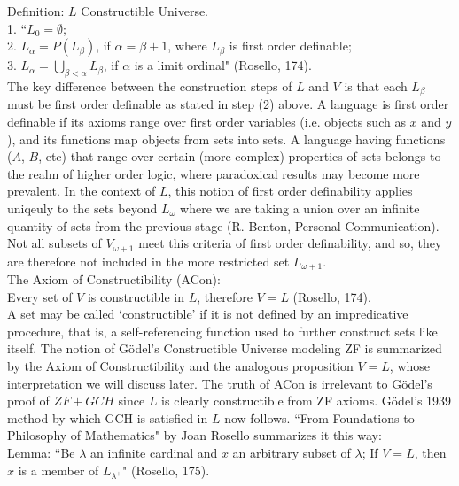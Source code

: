 \documentclass[10pt,letterpaper]{amsart}
\numberwithin{equation}{section}
\theoremstyle{plain}
\theoremstyle{definition}
\numberwithin{equation}{section}
\begin{document}
\noindent Definition: $L$ Constructible Universe.\\
1. ``$L_0=\emptyset$; \\
2. $L_{\alpha}=P(L_\beta)$, if $\alpha=\beta+1$, where $L_\beta$ is first order definable; \\
3. $L_\alpha=\bigcup_{\beta < \alpha} L_\beta$, if $\alpha$ is a limit ordinal" (Rosello, 174). \\

The key difference between the construction steps of $L$ and $V$ is that each $L_\beta$ must be first order definable as stated in step (2) above. A language is first order definable if its axioms range over first order variables (i.e. objects such as $x$ and $y$), and its functions map objects from sets into sets. A language having functions ($A$, $B$, etc) that range over certain (more complex) properties of sets belongs to the realm of higher order logic, where paradoxical results may become more prevalent. In the context of $L$, this notion of first order definability applies uniqeuly to the sets beyond $L_\omega$ where we are taking a union over an infinite quantity of sets from the previous stage (R. Benton, Personal Communication). Not all subsets of $V_{\omega+1}$ meet this criteria of first order definability, and so, they are therefore not included in the more restricted set $L_{\omega+1}$. \\

\noindent The Axiom of Constructibility (ACon):\\
Every set of $V$ is constructible in $L$, therefore $V=L$ (Rosello, 174).\\

A set may be called `constructible' if it is not defined by an impredicative procedure, that is, a self-referencing function used to further construct sets like itself. The notion of Gödel's Constructible Universe modeling ZF is summarized by the Axiom of Constructibility and the analogous proposition $V=L$, whose interpretation we will discuss later. The truth of ACon is irrelevant to Gödel's proof of $ZF+GCH$ since $L$ is clearly constructible from ZF axioms. Gödel's 1939 method by which GCH is satisfied in $L$ now follows. ``From Foundations to Philosophy of Mathematics" by Joan Rosello summarizes it this way:\\

\noindent Lemma: ``Be $\lambda$ an infinite cardinal and $x$ an arbitrary subset of $\lambda$; If $V=L$, then $x$ is a member of $L_{\lambda^+}$" (Rosello, 175). \\
\end{document}
